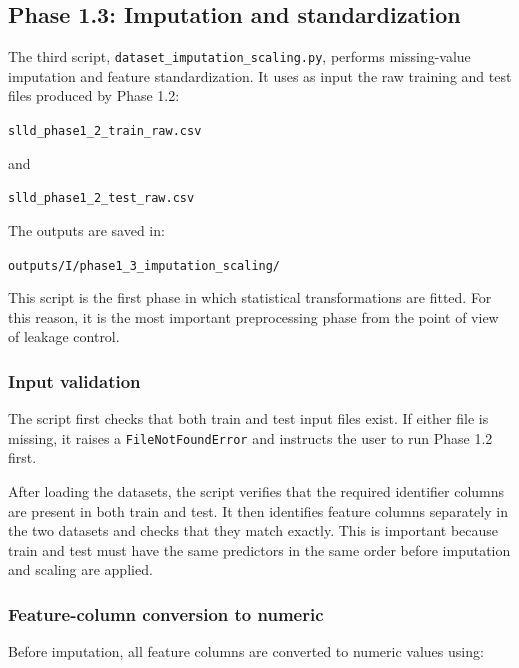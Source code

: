 \documentclass{ipgpmaster}
\begin{document}
\subsection{Phase 1.3: Imputation and standardization}

The third script, \texttt{dataset\_imputation\_scaling.py}, performs missing-value imputation and feature standardization. It uses as input the raw training and test files produced by Phase 1.2:

\begin{center}
\texttt{slld\_phase1\_2\_train\_raw.csv}
\end{center}

and

\begin{center}
\texttt{slld\_phase1\_2\_test\_raw.csv}
\end{center}

The outputs are saved in:

\begin{center}
\texttt{outputs/I/phase1\_3\_imputation\_scaling/}
\end{center}

This script is the first phase in which statistical transformations are fitted. For this reason, it is the most important preprocessing phase from the point of view of leakage control.

\subsubsection{Input validation}

The script first checks that both train and test input files exist. If either file is missing, it raises a \texttt{FileNotFoundError} and instructs the user to run Phase 1.2 first.

After loading the datasets, the script verifies that the required identifier columns are present in both train and test. It then identifies feature columns separately in the two datasets and checks that they match exactly. This is important because train and test must have the same predictors in the same order before imputation and scaling are applied.

\subsubsection{Feature-column conversion to numeric}

Before imputation, all feature columns are converted to numeric values using:
\end{document}

